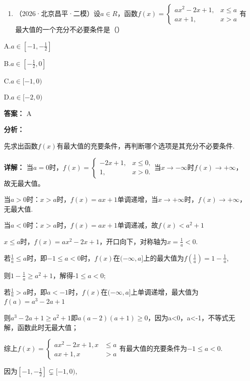 \documentclass[11pt,a4paper]{ctexart}
\begin{document}
\begin{enumerate}[label=\arabic*., leftmargin=*, start=3]
\item （2026·北京昌平·二模）设\(a \in R\)，函数\(f(x) = \begin{cases} ax^2 - 2x + 1, & x \leq a \\ ax + 1, & x > a \end{cases}\)有最大值的一个充分不必要条件是（）
\end{enumerate}

A.\(a \in \left[-1, -\frac{1}{2}\right]\)

B.\(a \in \left[-\frac{1}{2}, 0\right]\)

C.\(a \in [-1,0)\)

D.\(a \in [-2,0)\)

\textbf{答案：}
A

\textbf{分析：}

先求出函数\(f(x)\)有最大值的充要条件，再判断哪个选项是其充分不必要条件.

\textbf{详解：}
当\(a=0\)时，\(f(x)=\begin{cases}-2x+1,&x\leq0,\\1,&x>0.\end{cases}\)当\(x\to-\infty\)时\(f(x)\to+\infty\)，故无最大值。

当\(a > 0\)时：\(x > a\)时，\(f(x) = ax + 1\)单调递增，当\(x\to +\infty\)时，\(f(x)\rightarrow +\infty\)，无最大值.

当\(a < 0\)时：\(x > a\)时，\(f(x) = ax + 1\)单调递减，故\(f(x) < a^2 + 1\)

\(x \leq a\)时，\(f(x) = ax^2 - 2x + 1\)，开口向下，对称轴为\(x = \frac{1}{a} < 0\).

若\(\frac{1}{a} \leq a\)时，即\(-1 \leq a < 0\)时，\(f(x)\)在\((-\infty,a]\)上的最大值为\(f\left(\frac{1}{a}\right) = 1 - \frac{1}{a}\),

则\(1-\frac{1}{a}\geq a^{2}+1\)，解得-1\(\leq a<0\);

若\(\frac{1}{a} > a\)时，即\(a < -1\)时，\(f(x)\)在\((-\infty,a]\)上单调递增，最大值为\(f(a) = a^3 - 2a + 1\)

则\(a^{3}-2a+1\geq a^{2}+1\)即\(a(a-2)(a+1)\geq0\)，因为a\textless0，a\textless-1，不等式无解，函数此时无最大值；

综上\(f(x)=\left\{\begin{aligned}ax^{2}-2x+1,x&\leq a\\ ax+1,x&>a\end{aligned}\right.\)有最大值的充要条件为\(-1\leq a<0.\)

因为\(\left[-1,-\frac12\right]\subsetneq[-1,0)\),
\end{document}
